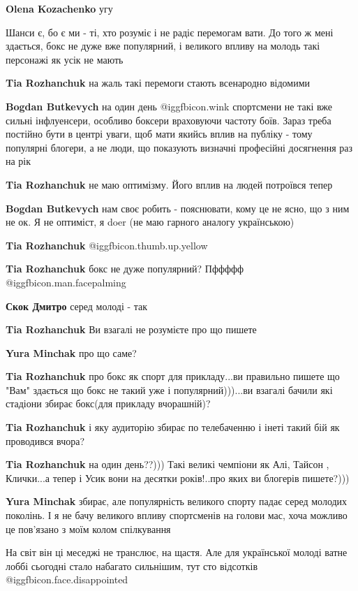 \begin{itemize}
\begin{itemize} %
\textbf{Olena Kozachenko} угу
\end{itemize} %


Шанси є, бо є ми - ті, хто розуміє і не радіє перемогам вати. До того ж мені
здається, бокс не дуже вже популярний, і великого впливу на молодь такі
персонажі як усік не мають

\begin{itemize} %
\textbf{Tia Rozhanchuk} на жаль такі перемоги стають всенародно відомими

\textbf{Bogdan Butkevych} на один день  @igg{fbicon.wink}  спортсмени не такі вже сильні інфлуенсери, особливо боксери враховуючи частоту боїв. Зараз треба постійно бути в центрі уваги, щоб мати якийсь вплив на публіку - тому популярні блогери, а не люди, що показують визначні професійні досягнення раз на рік

\textbf{Tia Rozhanchuk} не маю оптимізму. Його вплив на людей потроївся тепер

\textbf{Bogdan Butkevych} нам своє робить - пояснювати, кому це не ясно, що з ним не ок. Я не оптиміст, я doer (не маю гарного аналогу українською)

\textbf{Tia Rozhanchuk}  @igg{fbicon.thumb.up.yellow} 

\textbf{Tia Rozhanchuk} бокс не дуже популярний? Пффффф  @igg{fbicon.man.facepalming} 

\textbf{Скок Дмитро} серед молоді - так

\textbf{Tia Rozhanchuk} Ви взагалі не розумієте про що пишете

\textbf{Yura Minchak} про що саме?

\textbf{Tia Rozhanchuk} про бокс як спорт для прикладу...ви правильно пишете що "Вам" здається що бокс не такий уже і популярний)))...ви взагалі бачили які стадіони збирає бокс(для прикладу вчорашній)?

\textbf{Tia Rozhanchuk} і яку аудиторію збирає по телебаченню і інеті такий бій як проводився вчора?

\textbf{Tia Rozhanchuk} на один день??))) Такі великі чемпіони як Алі, Тайсон , Клички...а тепер і Усик вони на десятки років!..про яких ви блогерів пишете?)))

\textbf{Yura Minchak} збирає, але популярність великого спорту падає серед молодих поколінь. І я не бачу великого впливу спортсменів на голови мас, хоча можливо це пов'язано з моїм колом спілкування

\end{itemize} %

На світ він ці меседжі не транслює, на щастя.
Але для української молоді ватне лоббі сьогодні стало набагато сильнішим, тут сто відсотків  @igg{fbicon.face.disappointed} 


\end{itemize} %
